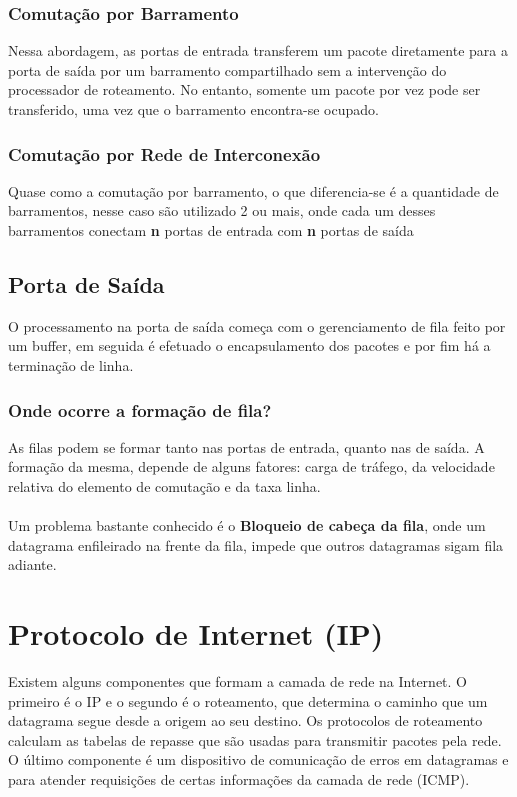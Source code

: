 \documentclass[a4paper, 12pt]{article}
\begin{document}
        \subsubsection{Comutação por Barramento}
        Nessa abordagem, as portas de entrada transferem um pacote diretamente para a porta de saída por um barramento compartilhado sem a intervenção
        do processador de roteamento. No entanto, somente um pacote por vez pode ser transferido, uma vez que o barramento encontra-se ocupado.

        \subsubsection{Comutação por Rede de Interconexão}
        Quase como a comutação por barramento, o que diferencia-se é a quantidade de barramentos, nesse caso são utilizado 2 ou mais, onde cada um 
        desses barramentos conectam \textbf{n} portas de entrada com \textbf{n} portas de saída

\subsection{Porta de Saída}
O processamento na porta de saída começa com o gerenciamento de fila feito por um buffer, em seguida é efetuado o encapsulamento dos pacotes e por 
fim há a terminação de linha.

    \subsubsection{Onde ocorre a formação de fila?}
    As filas podem se formar tanto nas portas de entrada, quanto nas de saída. A formação 
    da mesma, depende de alguns fatores: carga de tráfego, da velocidade relativa do 
    elemento de comutação e da taxa linha.
    \\
    \\
    Um problema bastante conhecido é o \textbf{Bloqueio de cabeça da fila}, onde um datagrama enfileirado na frente da fila, impede
    que outros datagramas sigam fila adiante.

\newpage

\section{Protocolo de Internet (IP)}
Existem alguns componentes que formam a camada de rede na Internet. O primeiro é o IP e o
segundo é o roteamento, que determina o caminho que um datagrama segue desde a origem ao
seu destino. Os protocolos de roteamento calculam as tabelas de repasse que são usadas
para transmitir pacotes pela rede. O último componente é um dispositivo de comunicação
de erros em datagramas e para atender requisições de certas informações da camada de 
rede (ICMP). 
\end{document}
